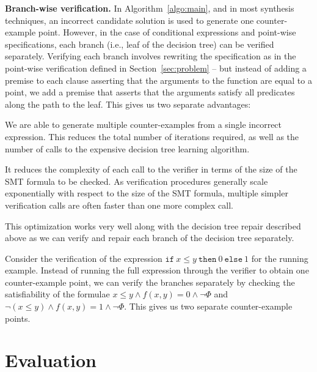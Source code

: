 \documentclass{llncs}
\newcommand\Spec{\Phi}
\newcommand\ITE[3]{\mathtt{if}~#1~\mathtt{then}~#2~\mathtt{else}~#3}
\renewcommand{\paragraph}[1]{\par\noindent\textbf{#1.}}
\begin{document}
\paragraph{Branch-wise verification}
In Algorithm~\ref{algo:main}, and in most synthesis techniques, an
incorrect candidate solution is used to generate one counter-example
point.
However, in the case of conditional expressions and point-wise
specifications, each branch (i.e., leaf of the decision tree) can be
verified separately.
Verifying each branch involves rewriting the specification as in the
point-wise verification defined in Section~\ref{sec:problem} -- but
instead of adding a premise to each clause asserting that the arguments
to the function are equal to a point, we add a premise that asserts that
the arguments satisfy all predicates along the path to the leaf.
This gives us two separate advantages:
\begin{compactitem}
\item We are able to generate multiple counter-examples from a single
  incorrect expression.
  This reduces the total number of iterations required, as well as the
  number of calls to the expensive decision tree learning algorithm.
\item It reduces the complexity of each call to the verifier in terms of
  the size of the SMT formula to be checked.
  As verification procedures generally scale exponentially with respect
  to the size of the SMT formula, multiple simpler verification calls
  are often faster than one more complex call.
\end{compactitem}
This optimization works very well along with the decision tree repair
described above as we can verify and repair each branch of the decision
tree separately.

\begin{example}
  Consider the verification of the expression $\ITE{x \leq y}{0}{1}$
  for the running example.
  Instead of running the full expression through the verifier to
  obtain one counter-example point, we can verify the branches
  separately by checking the satisfiability of the formulae $x \leq y
  \wedge f(x, y) = 0 \wedge \neg \Spec$ and $\neg (x \leq y) \wedge f(x,
  y) = 1 \wedge \neg \Spec$.
  This gives us two separate counter-example points.
\end{example}

\section{Evaluation}
\label{sec:evaluation}
% 
% 
\end{document}
